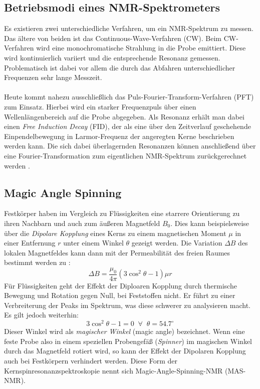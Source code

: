 \documentclass[a4paper, 11pt, headsepline,footsepline,twoside,abstract]{scrbook}
\begin{document}
\subsection{Betriebsmodi eines NMR-Spektrometers}
Es existieren zwei unterschiedliche Verfahren, um ein NMR-Spektrum zu messen. Das ältere von beiden ist das Continuous-Wave-Verfahren (CW). Beim CW-Verfahren wird eine monochromatische Strahlung in die Probe emittiert. Diese wird kontinuierlich variiert und die entsprechende Resonanz gemessen. Problematisch ist dabei vor allem die durch das Abfahren unterschiedlicher Frequenzen sehr lange Messzeit.
\\\\
Heute kommt nahezu ausschließlich das Puls-Fourier-Transform-Verfahren (PFT) zum Einsatz. Hierbei wird ein starker Frequenzpuls über einen Wellenlängenbereich auf die Probe abgegeben. Als Resonanz erhält man dabei einen \textit{Free Induction Decay} (FID), der als eine über den Zeitverlauf geschehende Einpendelbewegung in Larmor-Frequenz der angeregten Kerne beschrieben werden kann. Die sich dabei überlagernden Resonanzen können anschließend über eine Fourier-Transformation zum eigentlichen NMR-Spektrum zurückgerechnet werden \cite{Guenther2013}.
\subsection{Magic Angle Spinning}
Festkörper haben im Vergleich zu Flüssigkeiten eine starrere Orientierung zu ihren Nachbarn und auch zum äußeren Magnetfeld $B_0$. Dies kann beispielsweise über die \textit{Dipolare Kopplung} eines Kerns zu einem magnetischen Moment $\mu$ in einer Entfernung $r$ unter einem Winkel $\theta$ gezeigt werden. Die Variation $\Delta B$ des lokalen Magnetfeldes kann dann mit der Permeabilität des freien Raumes bestimmt werden zu \cite{Guenther2013}:
\begin{equation}
\Delta B = \frac{\mu_0}{4\pi}(3\cos^2\theta - 1)\mu r
\end{equation}
Für Flüssigkeiten geht der Effekt der Diploaren Kopplung  durch thermische Bewegung und Rotation gegen Null, bei Feststoffen nicht. Er führt zu einer Verbreiterung der Peaks im Spektrum, was diese schwerer zu analysieren macht. Es gilt jedoch weiterhin:
\begin{equation}
3\cos^2\theta-1 = 0 \;\; \forall \;\; \theta = 54.7^\circ
\end{equation}
Dieser Winkel wird als \textit{magischer Winkel} (magic angle) bezeichnet. Wenn eine feste Probe also in einem speziellen Probengefäß (\textit{Spinner}) im magischen Winkel durch das Magnetfeld rotiert wird, so kann der Effekt der Dipolaren Kopplung auch bei Festkörpern verhindert werden. Diese Form der Kernspinresonanzspektroskopie nennt sich Magic-Angle-Spinning-NMR (MAS-NMR).
\end{document}
